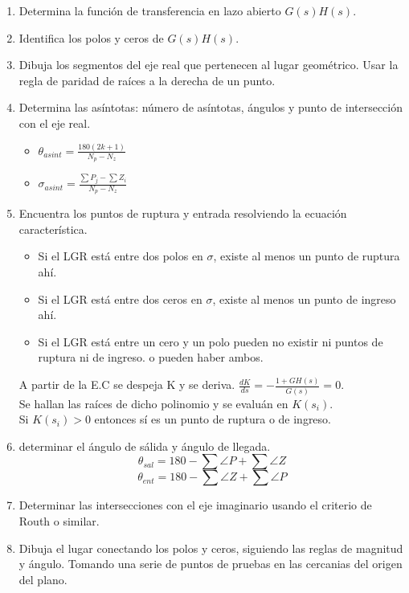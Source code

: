 \documentclass[legalpaper,twocolumn]{article}
\begin{document}
\begin{enumerate}
    \item Determina la función de transferencia en lazo abierto \( G(s)H(s) \).
    \item Identifica los polos y ceros de \( G(s)H(s) \).
    \item Dibuja los segmentos del eje real que pertenecen al lugar geométrico. Usar la regla de paridad de raíces a la derecha de un punto.
    \item Determina las asíntotas: número de asíntotas, ángulos y punto de intersección con el eje real.
          \begin{itemize}
              \item $\theta_{asint}=\frac{180 (2k+1)}{N_p - N_z}$
              \item $\sigma_{asint}=\frac{\sum P_j - \sum Z_i  }{N_p - N_z}$
          \end{itemize}
    \item Encuentra los puntos de ruptura y entrada resolviendo la ecuación característica.
          \begin{itemize}
              \item Si el LGR está entre dos polos en $\sigma$, existe al menos un punto de ruptura ahí.
              \item Si el LGR está entre dos ceros en $\sigma$, existe al menos un punto de ingreso ahí.
              \item Si el LGR está entre un cero y un polo pueden no existir ni puntos de ruptura ni de ingreso. o pueden haber ambos.
          \end{itemize}
          A partir de la E.C se despeja K y se deriva.
          \(\frac{dK}{ds}=-\frac{1 + GH(s)}{G(s)}=0\).\\Se hallan las raíces de dicho polinomio y se evaluán en $K(s_i)$.\\ Si $K(s_i)> 0$ entonces sí es un punto de ruptura o de ingreso.
    \item determinar el ángulo de sálida y ángulo de llegada.
          \[\theta_{sal}=180 - \sum \angle P + \sum \angle Z\]
          \[\theta_{ent}=180 - \sum\angle Z + \sum\angle P \]
    \item Determinar las intersecciones con el eje imaginario usando el criterio de Routh o similar.
    \item Dibuja el lugar conectando los polos y ceros, siguiendo las reglas de magnitud y ángulo. Tomando una serie de puntos de pruebas en las cercanias del origen del plano.
\end{enumerate}
\end{document}
